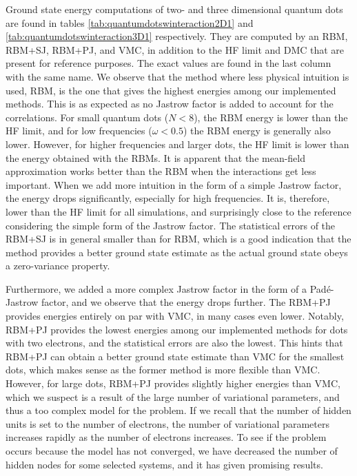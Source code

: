 Ground state energy computations of two- and three dimensional quantum dots are found in tables \eqref{tab:quantumdotswinteraction2D1} and \eqref{tab:quantumdotswinteraction3D1} respectively. They are computed by an RBM, RBM+SJ, RBM+PJ, and VMC, in addition to the HF limit and DMC that are present for reference purposes. The exact values are found in the last column with the same name. We observe that the method where less physical intuition is used, RBM, is the one that gives the highest energies among our implemented methods. This is as expected as no Jastrow factor is added to account for the correlations. For small quantum dots ($N<8$), the RBM energy is lower than the HF limit, and for low frequencies ($\omega<0.5$) the RBM energy is generally also lower. However, for higher frequencies and larger dots, the HF limit is lower than the energy obtained with the RBMs. It is apparent that the mean-field approximation works better than the RBM when the interactions get less important. When we add more intuition in the form of a simple Jastrow factor, the energy drops significantly, especially for high frequencies. It is, therefore, lower than the HF limit for all simulations, and surprisingly close to the reference considering the simple form of the Jastrow factor. The statistical errors of the RBM+SJ is in general smaller than for RBM, which is a good indication that the method provides a better ground state estimate as the actual ground state obeys a zero-variance property. 

Furthermore, we added a more complex Jastrow factor in the form of a Padé-Jastrow factor, and we observe that the energy drops further. The RBM+PJ provides energies entirely on par with VMC, in many cases even lower. Notably, RBM+PJ provides the lowest energies among our implemented methods for dots with two electrons, and the statistical errors are also the lowest. This hints that RBM+PJ can obtain a better ground state estimate than VMC for the smallest dots, which makes sense as the former method is more flexible than VMC. However, for large dots, RBM+PJ provides slightly higher energies than VMC, which we suspect is a result of the large number of variational parameters, and thus a too complex model for the problem. If we recall that the number of hidden units is set to the number of electrons, the number of variational parameters increases rapidly as the number of electrons increases. To see if the problem occurs because the model has not converged, we have decreased the number of hidden nodes for some selected systems, and it has given promising results.

